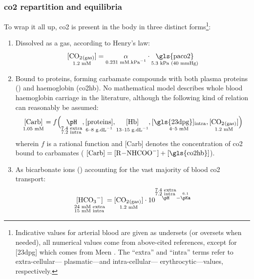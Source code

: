 \subsubsection{\texorpdfstring{\gls{co2}}{CO2} repartition and equilibria}

To wrap it all up, \gls{co2} is present in the body in three distinct forms\footnote{Indicative values for arterial blood are given as undersets (or oversets when needed), all numerical values come from above-cited references, except for [\gls{23dpg}] which comes from Meen \etal{}\cite{meen1981}. The \enquote{extra} and \enquote{intra} terms refer to extra-cellular---\ie{} plasmatic---and intra-cellular---\ie{} erythrocytic---values, respectively.}:
\begin{enumerate}
	\item Dissolved as a gas, according to Henry's law:\begin{equation}
		\underset{\text{1.2~mM}}{\ce{[CO2_{(gas)}]}} = \underset{\text{0.231~mM.kPa$^{-1}$}}{\alpha} \cdot \underset{\text{5.3~kPa (40~mmHg)}}{\text{\gls{paco2}}}
	\end{equation}
	\item Bound to proteins, forming carbamate compounds with both plasma proteins () and haemoglobin (\gls{co2hb}). No mathematical model describes whole blood haemoglobin carriage in the literature, although the following kind of relation can reasonably be assumed:
	\begin{equation}\label{eq:co2hb:unknown_carb}
		\underset{\text{1.05~mM}}{[\text{Carb}]} = f\Bigl(
		\underset{
			\begin{subarray}{l}
				\text{7.4 extra}\\
				\text{7.2 intra}
			\end{subarray}}{\pH},
		\underset{\text{6--8~g.dL$^{-1}$}}{[\text{proteins}]}, 
		\underset{\text{13--15~g.dL$^{-1}$}}{[\text{Hb}]}, 
		\underset{\text{4--5~mM}}{[\text{\gls{23dpg}}]_{\text{intra}}},
		\underset{\text{1.2~mM}}{\ce{[CO2_{(gas)}]}} \Bigr)
	\end{equation} wherein $f$ is a rational function and [Carb] denotes the concentration of \gls{co2} bound to carbamates (\ie{} $[\text{Carb}] = [\ce{R-NHCOO-}] + [\text{\gls{co2hb}}]$).
	\item As bicarbonate ions () accounting for the vast majority of blood \gls{co2} transport:\begin{equation}
		\underset{\begin{subarray}{l}
				\text{24~mM extra}\\
				\text{15~mM intra}
			\end{subarray}}{\ce{[HCO3^-]}} = \underset{\text{1.2~mM}}{\ce{[CO2_{(gas)}]}}\cdot 10^{\overset{\begin{subarray}{l}
					\text{7.4 extra}\\
					\text{7.2 intra}
			\end{subarray}}{\pH} - \overset{6.1\vphantom{p}}{\pKa}}
	\end{equation}
\end{enumerate}

